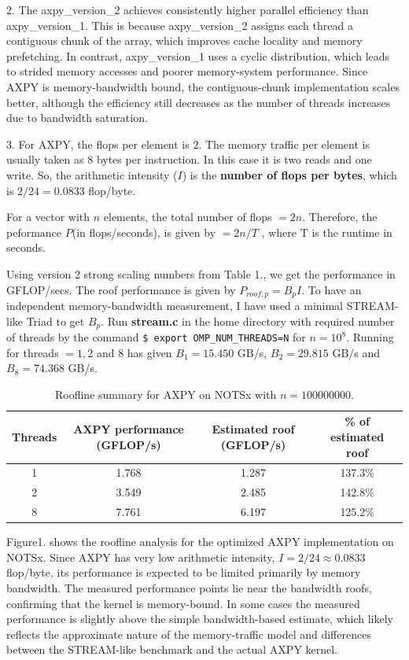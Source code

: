 \documentclass{article}[12pt]
\begin{document}
2. The axpy\_version\_2 achieves consistently  higher parallel efficiency than axpy\_version\_1. This is because  axpy\_version\_2 assigns each thread a contiguous chunk of the array, which improves cache locality and memory prefetching. In contrast,  axpy\_version\_1 uses a cyclic distribution, which leads to strided memory accesses and poorer memory-system performance. Since AXPY is memory-bandwidth bound, the contiguous-chunk implementation scales better, although the efficiency still decreases as the number of threads increases due to bandwidth saturation.

\vspace{0.5cm}
3. For AXPY, the flops per element is $2$. The memory traffic per element is usually taken as $8$ bytes per instruction. In this case it is two reads and one write. So, the arithmetic intensity ($I$) is the \textbf{number of flops per bytes}, which is $2/24 = 0.0833$ flop/byte.

For a vector with $n$ elements, the total number of flops $ = 2n$. Therefore, the peformance $P$(in flops/seconds), is given by $ = 2n/T$ , where T is the runtime in seconds. 

Using version 2 strong scaling numbers from Table 1., we get the performance in GFLOP/secs. The roof performance is given by $P_{roof,p} = B_p I$. To have an independent memory-bandwidth measurement, I have used a minimal STREAM-like Triad to get $B_p$. Run \textbf{stream.c} in the home directory with required number of threads by the command \texttt{\$ export OMP\_NUM\_THREADS=N} for $n=10^8$. Running for threads $=1,2$ and 8 has given $B_1 = 15.450$ GB/s, $B_2 = 29.815$ GB/s and $B_8 = 74.368$ GB/s.
\begin{table}[H]
\centering
\begin{tabular}{c c c c}
\hline
\textbf{Threads} & \textbf{AXPY performance (GFLOP/s)} & \textbf{Estimated roof (GFLOP/s)} & \textbf{\% of estimated roof} \\
\hline
1 & 1.768 & 1.287 & 137.3\% \\
2 & 3.549 & 2.485 & 142.8\% \\
8 & 7.761 & 6.197 & 125.2\% \\
\hline
\end{tabular}
\caption{Roofline summary for AXPY on NOTSx with $n=100000000$.}
\label{tab:roofline_axpy_notsx}
\end{table}

Figure1. shows the roofline analysis for the optimized AXPY implementation on NOTSx. Since AXPY has very low arithmetic intensity, \(I = 2/24 \approx 0.0833\) flop/byte, its performance is expected to be limited primarily by memory bandwidth. The measured performance points lie near the bandwidth roofs, confirming that the kernel is memory-bound. In some cases the measured performance is slightly above the simple bandwidth-based estimate, which likely reflects the approximate nature of the memory-traffic model and differences between the STREAM-like benchmark and the actual AXPY kernel.
 
\end{document}
